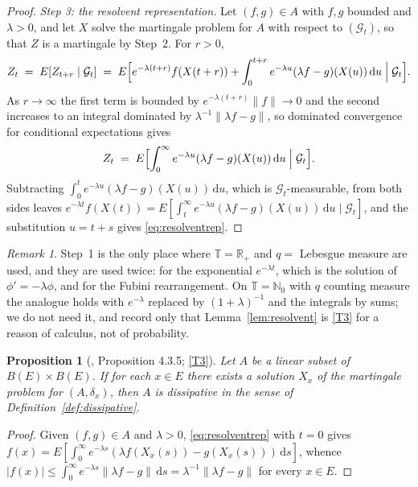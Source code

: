 \documentclass[11pt,a4paper]{article}
\theoremstyle{plain}
\newtheorem{proposition}[theorem]{Proposition}
\theoremstyle{definition}
\theoremstyle{remark}
\newtheorem{remark}[theorem]{Remark}
\newcommand{\R}{\mathbb{R}}
\newcommand{\N}{\mathbb{N}}
\newcommand{\Rp}{\R_+}
\newcommand{\T}{\mathbb{T}}                     %
\newcommand{\Bdd}{B}                           %
\newcommand{\Gilt}{\mathcal{G}}
\newcommand{\dif}{\,\mathrm{d}}
\newcommand{\EK}{\cite{EK86}}
\begin{document}
\begin{proof}
  \emph{Step 3: the resolvent representation.}
  Let $(f,g) \in A$ with $f,g$ bounded and $\lambda > 0$, and let $X$ solve the
  martingale problem for $A$ with respect to $(\Gilt_t)$, so that $Z$ is a
  martingale by Step~2.  For $r > 0$,
  \[
    Z_t \;=\; E[Z_{t+r} \mid \Gilt_t]
      \;=\; E\Bigl[ e^{-\lambda(t+r)} f(X(t+r))
        + \int_0^{t+r} e^{-\lambda u}(\lambda f - g)(X(u))\dif u \Bigm| \Gilt_t \Bigr] .
  \]
  As $r \to \infty$ the first term is bounded by $e^{-\lambda(t+r)}\lVert f\rVert
  \to 0$ and the second increases to an integral dominated by
  $\lambda^{-1}\lVert \lambda f - g\rVert$, so dominated convergence for
  conditional expectations gives
  \[
    Z_t \;=\; E\Bigl[ \int_0^\infty e^{-\lambda u}(\lambda f - g)(X(u))\dif u
      \Bigm| \Gilt_t \Bigr] .
  \]
  Subtracting $\int_0^t e^{-\lambda u}(\lambda f-g)(X(u))\dif u$, which is
  $\Gilt_t$-measurable, from both sides leaves
  $e^{-\lambda t}f(X(t)) = E[\int_t^\infty e^{-\lambda u}(\lambda f-g)(X(u))\dif u
  \mid \Gilt_t]$, and the substitution $u = t+s$ gives
  \eqref{eq:resolventrep}.
\end{proof}

\begin{remark}
  \label{rem:resolventscope}
  Step~1 is the only place where $\T = \Rp$ and $q = $ Lebesgue measure are used,
  and they are used twice: for the exponential $e^{-\lambda t}$, which is the
  solution of $\phi' = -\lambda\phi$, and for the Fubini rearrangement.  On
  $\T = \N_0$ with $q$ counting measure the analogue holds with $e^{-\lambda}$
  replaced by $(1+\lambda)^{-1}$ and the integrals by sums; we do not need it,
  and record only that Lemma~\ref{lem:resolvent} is \eqref{T3} for a reason of calculus,
  not of probability.
\end{remark}

\begin{proposition}[\EK, Proposition 4.3.5; \eqref{T3}]
  \label{prop:dissipative}
  Let $A$ be a linear subset of $\Bdd(E) \times \Bdd(E)$.  If for each
  $x \in E$ there exists a solution $X_x$ of the martingale problem for
  $(A,\delta_x)$, then $A$ is dissipative in the sense of
  Definition~\ref{def:dissipative}.
\end{proposition}

\begin{proof}
  Given $(f,g) \in A$ and $\lambda > 0$, \eqref{eq:resolventrep} with
  $t = 0$ gives
  $f(x) = E[\int_0^\infty e^{-\lambda s}(\lambda f(X_x(s)) - g(X_x(s)))\dif s]$,
  whence
  $|f(x)| \leq \int_0^\infty e^{-\lambda s} \lVert \lambda f - g \rVert \dif s
   = \lambda^{-1} \lVert \lambda f - g \rVert$ for every $x \in E$.
\end{proof}
\end{document}
